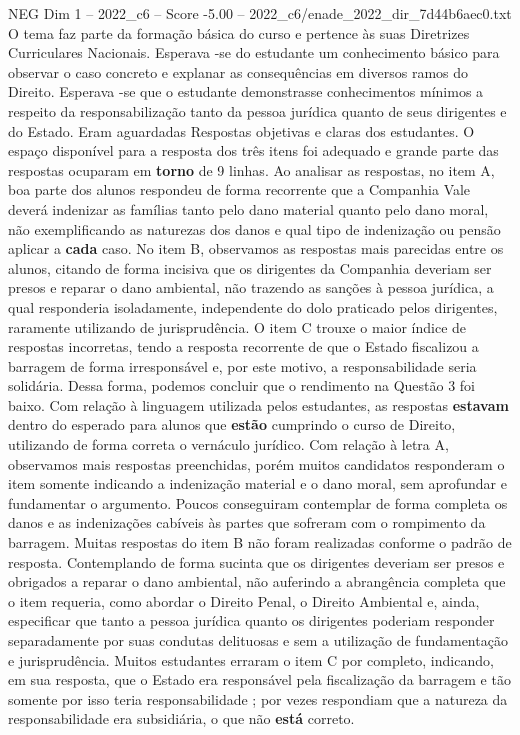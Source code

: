 \begin{textsample}{NEG Dim 1 – 2022\_c6 – Score -5.00 – 2022\_c6/enade\_2022\_dir\_7d44b6aec0.txt}
O tema faz parte da formação básica do curso e pertence às suas Diretrizes Curriculares Nacionais.
Esperava -se do estudante um conhecimento básico para observar o caso concreto e explanar as consequências em diversos ramos do Direito.
Esperava -se que o estudante demonstrasse conhecimentos mínimos a respeito da responsabilização tanto da pessoa jurídica quanto de seus dirigentes e do Estado.
Eram aguardadas Respostas objetivas e claras dos estudantes.
O espaço disponível para a resposta dos três itens foi adequado e grande parte das respostas ocuparam em \textbf{torno} de 9 linhas.
Ao analisar as respostas, no item A, boa parte dos alunos respondeu de forma recorrente que a Companhia Vale deverá indenizar as famílias tanto pelo dano material quanto pelo dano moral, não exemplificando as naturezas dos danos e qual tipo de indenização ou pensão aplicar a \textbf{cada} caso.
No item B, observamos as respostas mais parecidas entre os alunos, citando de forma incisiva que os dirigentes da Companhia deveriam ser presos e reparar o dano ambiental, não trazendo as sanções à pessoa jurídica, a qual responderia isoladamente, independente do dolo praticado pelos dirigentes, raramente utilizando de jurisprudência.
O item C trouxe o maior índice de respostas incorretas, tendo a resposta recorrente de que o Estado fiscalizou a barragem de forma irresponsável e, por este motivo, a responsabilidade seria solidária.
Dessa forma, podemos concluir que o rendimento na Questão 3 foi baixo.
Com relação à linguagem utilizada pelos estudantes, as respostas \textbf{estavam} dentro do esperado para alunos que \textbf{estão} cumprindo o curso de Direito, utilizando de forma correta o vernáculo jurídico.
Com relação à letra A, observamos mais respostas preenchidas, porém muitos candidatos responderam o item somente indicando a indenização material e o dano moral, sem aprofundar e fundamentar o argumento.
Poucos conseguiram contemplar de forma completa os danos e as indenizações cabíveis às partes que sofreram com o rompimento da barragem.
Muitas respostas do item B não foram realizadas conforme o padrão de resposta.
Contemplando de forma sucinta que os dirigentes deveriam ser presos e obrigados a reparar o dano ambiental, não auferindo a abrangência completa que o item requeria, como abordar o Direito Penal, o Direito Ambiental e, ainda, especificar que tanto a pessoa jurídica quanto os dirigentes poderiam responder separadamente por suas condutas delituosas e sem a utilização de fundamentação e jurisprudência.
Muitos estudantes erraram o item C por completo, indicando, em sua resposta, que o Estado era responsável pela fiscalização da barragem e tão somente por isso teria responsabilidade ; por vezes respondiam que a natureza da responsabilidade era subsidiária, o que não \textbf{está} correto.

\end{textsample}

